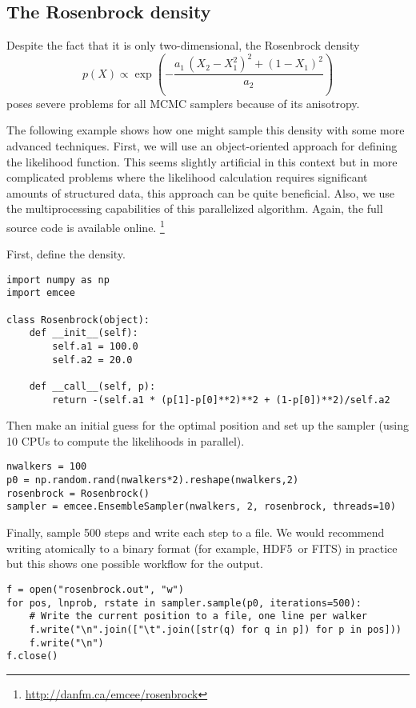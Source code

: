 \documentclass[12pt,preprint]{aastex}
\newcommand{\project}[1]{{\sffamily #1}}
\renewcommand{\vector}[1]{#1}
\begin{document}
\subsection{The Rosenbrock density}

Despite the fact that it is only two-dimensional, the Rosenbrock density
\begin{equation}
    p(\vector{X}) \propto \exp \left ( -\frac{a_1 \,
        (X_2 - X_1^2)^2+ (1-X_1)^2}{a_2} \right )
\end{equation}
poses severe problems for all MCMC samplers because of its anisotropy.

The following example shows how one might sample this density with some more
advanced techniques. First, we will use an object-oriented approach for
defining the likelihood function. This seems slightly artificial in this
context but in more complicated problems where the likelihood calculation
requires significant amounts of structured data, this approach can be
quite beneficial. Also, we use the multiprocessing capabilities of this
parallelized algorithm. Again, the full source code is available online.%
\footnote{\url{http://danfm.ca/emcee/rosenbrock}}

First, define the density.
\begin{lstlisting}
import numpy as np
import emcee

class Rosenbrock(object):
    def __init__(self):
        self.a1 = 100.0
        self.a2 = 20.0

    def __call__(self, p):
        return -(self.a1 * (p[1]-p[0]**2)**2 + (1-p[0])**2)/self.a2
\end{lstlisting}
Then make an initial guess for the optimal position and set up the sampler
(using 10 CPUs to compute the likelihoods in parallel).
\begin{lstlisting}
nwalkers = 100
p0 = np.random.rand(nwalkers*2).reshape(nwalkers,2)
rosenbrock = Rosenbrock()
sampler = emcee.EnsembleSampler(nwalkers, 2, rosenbrock, threads=10)
\end{lstlisting}
Finally, sample 500 steps and write each step to a file. We would recommend
writing atomically to a binary format (for example, \project{HDF5}\ or
\project{FITS}) in practice but this shows one possible
workflow for the output.
\begin{lstlisting}
f = open("rosenbrock.out", "w")
for pos, lnprob, rstate in sampler.sample(p0, iterations=500):
    # Write the current position to a file, one line per walker
    f.write("\n".join(["\t".join([str(q) for q in p]) for p in pos]))
    f.write("\n")
f.close()
\end{lstlisting}
\end{document}
